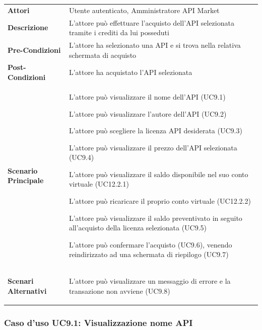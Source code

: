 \begin{longtable}{ l | p{11cm}}
	\hline
	\rowcolor{Gray}
	\multicolumn{2}{c}{UC9 - Acquisto API}\\
	\hline
	\textbf{Attori} & Utente autenticato, Amministratore API Market \\
	\textbf{Descrizione} & L'attore può effettuare l'acquisto dell'API selezionata tramite i crediti da lui posseduti \\
	\textbf{Pre-Condizioni} & L'attore ha selezionato una API e si trova nella relativa schermata di acquisto \\
	\textbf{Post-Condizioni} & L'attore ha acquistato l'API selezionata \\
	\textbf{Scenario Principale} & 
	\begin{enumerate*}[label=(\arabic*.),itemjoin={\newline}]
		\item L'attore può visualizzare il nome dell'API (UC9.1)
		\item L'attore può visualizzare l'autore dell'API (UC9.2)
		\item L'attore può scegliere la licenza API desiderata (UC9.3)
		\item L'attore può visualizzare il prezzo dell'API selezionata (UC9.4)
		\item L'attore può visualizzare il saldo disponibile nel suo conto virtuale (UC12.2.1)
		\item L'attore può ricaricare il proprio conto virtuale (UC12.2.2)
		\item L'attore può visualizzare il saldo preventivato in seguito all'acquisto della licenza selezionata (UC9.5)
		\item L'attore può confermare l'acquisto (UC9.6), venendo reindirizzato ad una schermata di riepilogo (UC9.7)
	\end{enumerate*}\\
	\textbf{Scenari Alternativi} & 
	\begin{enumerate*}[label=(\arabic*.),itemjoin={\newline}]
		\item L'attore può visualizzare un messaggio di errore e la transazione non avviene (UC9.8)
	\end{enumerate*}\\
\end{longtable}

\subsubsection{Caso d'uso UC9.1: Visualizzazione nome API}
\label{UC9_1}

